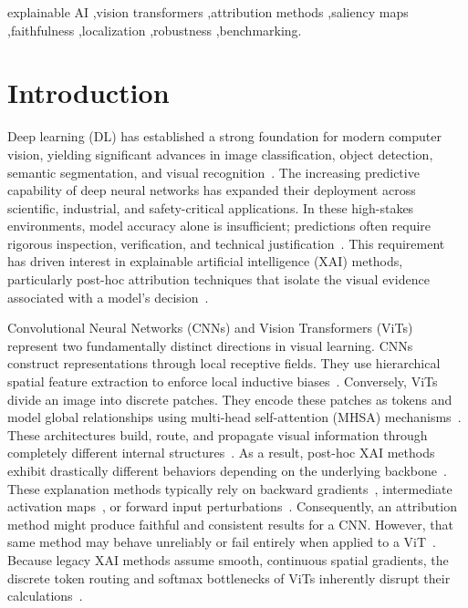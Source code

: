 \documentclass[final,5p,times,twocolumn]{elsarticle}
\begin{document}
\begin{frontmatter}
\begin{keyword}
explainable AI \sep vision transformers \sep attribution methods \sep saliency maps \sep faithfulness \sep localization \sep robustness \sep benchmarking.
\end{keyword}

\end{frontmatter}

\section{Introduction}
\label{sec:introduction}

Deep learning (DL) has established a strong foundation for modern computer vision, yielding significant advances in image classification, object detection, semantic segmentation, and visual recognition~\cite{russakovsky2015imagenet,he2016resnet,liu2022convnext}. The increasing predictive capability of deep neural networks has expanded their deployment across scientific, industrial, and safety-critical applications. In these high-stakes environments, model accuracy alone is insufficient; predictions often require rigorous inspection, verification, and technical justification~\cite{nauta2023anecdotal}. This requirement has driven interest in explainable artificial intelligence (XAI) methods, particularly post-hoc attribution techniques that isolate the visual evidence associated with a model's decision~\cite{bach2015lrp,bodria2023benchmarking}.

Convolutional Neural Networks (CNNs) and Vision Transformers (ViTs) represent two fundamentally distinct directions in visual learning. CNNs construct representations through local receptive fields. They use hierarchical spatial feature extraction to enforce local inductive biases~\cite{he2016resnet}. Conversely, ViTs divide an image into discrete patches. They encode these patches as tokens and model global relationships using multi-head self-attention (MHSA) mechanisms~\cite{dosovitskiy2021vit}. These architectures build, route, and propagate visual information through completely different internal structures~\cite{raghu2021vit}. As a result, post-hoc XAI methods exhibit drastically different behaviors depending on the underlying backbone~\cite{chefer2021transformer,wu2024faithfulness}. These explanation methods typically rely on backward gradients~\cite{simonyan2014saliency,sundararajan2017ig}, intermediate activation maps~\cite{selvaraju2017gradcam}, or forward input perturbations~\cite{zeiler2014occlusion,petsiuk2018rise}. Consequently, an attribution method might produce faithful and consistent results for a CNN. However, that same method may behave unreliably or fail entirely when applied to a ViT~\cite{chefer2021transformer}.
Because legacy XAI methods assume smooth, continuous spatial gradients, the discrete token routing and softmax bottlenecks of ViTs inherently disrupt their calculations~\cite{abnar2020rollout,achtibat2024attnlrp}.
\end{document}
